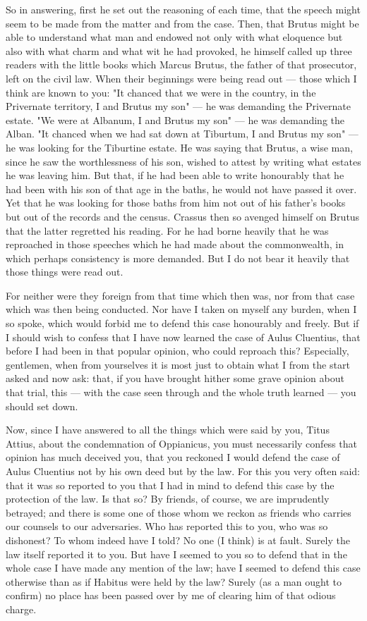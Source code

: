  So in answering, first he set out the reasoning of each time, that the speech might seem to be made from the matter and from the case. Then, that Brutus might be able to understand what man and endowed not only with what eloquence but also with what charm and what wit he had provoked, he himself called up three readers with the little books which Marcus Brutus, the father of that prosecutor, left on the civil law. When their beginnings were being read out --- those which I think are known to you: "It chanced that we were in the country, in the Privernate territory, I and Brutus my son" --- he was demanding the Privernate estate. "We were at Albanum, I and Brutus my son" --- he was demanding the Alban. "It chanced when we had sat down at Tiburtum, I and Brutus my son" --- he was looking for the Tiburtine estate. He was saying that Brutus, a wise man, since he saw the worthlessness of his son, wished to attest by writing what estates he was leaving him. But that, if he had been able to write honourably that he had been with his son of that age in the baths, he would not have passed it over. Yet that he was looking for those baths from him not out of his father's books but out of the records and the census. Crassus then so avenged himself on Brutus that the latter regretted his reading. For he had borne heavily that he was reproached in those speeches which he had made about the commonwealth, in which perhaps consistency is more demanded. But I do not bear it heavily that those things were read out.

 For neither were they foreign from that time which then was, nor from that case which was then being conducted. Nor have I taken on myself any burden, when I so spoke, which would forbid me to defend this case honourably and freely. But if I should wish to confess that I have now learned the case of Aulus Cluentius, that before I had been in that popular opinion, who could reproach this? Especially, gentlemen, when from yourselves it is most just to obtain what I from the start asked and now ask: that, if you have brought hither some grave opinion about that trial, this --- with the case seen through and the whole truth learned --- you should set down.

 Now, since I have answered to all the things which were said by you, Titus Attius, about the condemnation of Oppianicus, you must necessarily confess that opinion has much deceived you, that you reckoned I would defend the case of Aulus Cluentius not by his own deed but by the law. For this you very often said: that it was so reported to you that I had in mind to defend this case by the protection of the law. Is that so? By friends, of course, we are imprudently betrayed; and there is some one of those whom we reckon as friends who carries our counsels to our adversaries. Who has reported this to you, who was so dishonest? To whom indeed have I told? No one (I think) is at fault. Surely the law itself reported it to you. But have I seemed to you so to defend that in the whole case I have made any mention of the law; have I seemed to defend this case otherwise than as if Habitus were held by the law? Surely (as a man ought to confirm) no place has been passed over by me of clearing him of that odious charge.

